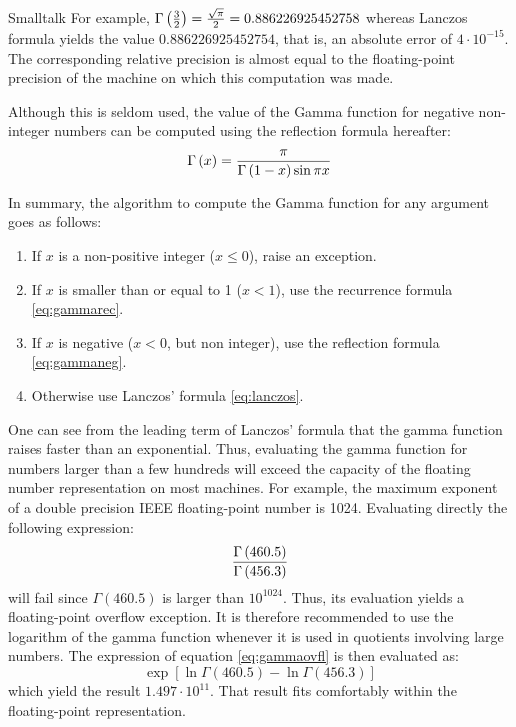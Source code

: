 \begin{listing}{Smalltalk}
For example, $\Gamma\left({3\over 2}\right)={\sqrt{\pi}\over 2}=
0.886226925452758$ whereas Lanczos formula yields the value
$0.886226925452754$, that is, an absolute error of $4\cdot
10^{-15} $. The corresponding relative precision is almost equal
to the floating-point precision of the machine on which this
computation was made.

Although this is seldom used, the value of the Gamma function for
negative non-integer numbers can be computed using the reflection
formula hereafter:
\begin{equation}
\label{eq:gammaneg} \Gamma\left(x\right)={\pi\over
\Gamma\left(1-x\right) \sin\pi x}
\end{equation}

In summary, the algorithm to compute the Gamma function for any
argument goes as follows:
\begin{enumerate}
  \item If $x$ is a non-positive integer ($x\le0$), raise an exception.
  \item If $x$ is smaller than or equal to 1 ($x<1$), use the recurrence formula \ref{eq:gammarec}.
  \item If $x$ is negative ($x<0$, but non integer), use the reflection
formula \ref{eq:gammaneg}.
  \item Otherwise use Lanczos' formula \ref{eq:lanczos}.
\end{enumerate}

One can see from the leading term of Lanczos' formula that the
gamma function raises faster than an exponential. Thus, evaluating
the gamma function for numbers larger than a few hundreds will
exceed the capacity of the floating number representation on most
machines. For example, the maximum exponent of a double precision
IEEE floating-point number is 1024. Evaluating directly the
following expression:
\begin{equation}
\label{eq:gammaovfl}
  {\Gamma\left(460.5\right)\over\Gamma\left(456.3\right)}
\end{equation}
will fail since $\Gamma\left(460.5\right)$ is larger than
$10^{1024}$. Thus, its evaluation yields a floating-point overflow
exception. It is therefore recommended to use the logarithm of the
gamma function whenever it is used in quotients involving large
numbers. The expression of equation \ref{eq:gammaovfl} is then
evaluated as:
\begin{equation}
  \exp\left[\ln\Gamma\left(460.5\right)-\ln\Gamma\left(456.3\right)\right]
\end{equation}
which yield the result $1.497\cdot 10^{11}$. That result fits
comfortably within the floating-point representation.


\end{listing}
